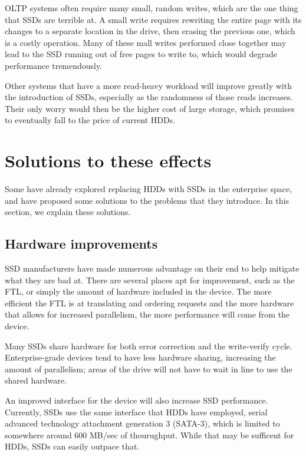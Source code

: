\documentclass[format=acmsmall, review=false, screen=true]{acmart}
\begin{document}
OLTP systems often require many small, random writes, which are the one thing that SSDs are terrible at. A small write 
requires rewriting the entire page with its changes to a separate location in the drive, then erasing the previous one, 
which is a costly operation. Many of these mall writes performed close together may lead to the SSD running out of free 
pages to write to, which would degrade performance tremendously. \cite{Cornwell2012, Micheloni2013, MatejFucek2014, Chen2016}

Other systems that have a more read-heavy workload will improve greatly with the introduction of SSDs, especially as the 
randomness of those reads increases. Their only worry would then be the higher cost of large storage, which promises to 
eventually fall to the price of current HDDs. \cite{Chen2016}

\section{Solutions to these effects}

Some have already explored replacing HDDs with SSDs in the enterprise space, and have proposed some solutions to the 
problems that they introduce. In this section, we explain these solutions.

\subsection{Hardware improvements}

SSD manufacturers have made numerous advantage on their end to help mitigate what they are bad at. There are several 
places apt for improvement, such as the FTL, or simply the amount of hardware included in the device. The more efficient 
the FTL is at translating and ordering requests and the more hardware that allows for increased parallelism, the more 
performance will come from the device. \cite{Xie2011, Chen2016}

Many SSDs share hardware for both error correction and the write-verify cycle. Enterprise-grade devices tend to have 
less hardware sharing, increasing the amount of parallelism; areas of the drive will not have to wait in line to use 
the shared hardware. \cite{Dirik2009, Cornwell2012, Micheloni2013, MatejFucek2014, Chen2016}

An improved interface for the device will also increase SSD performance. Currently, SSDs use the same interface that 
HDDs have employed, serial advanced technology attachment generation 3 (SATA-3), which is limited to somewhere around
600 MB/sec of thourughput. While that may be sufficent for HDDs, SSDs can easily outpace that. \cite{Micheloni2013}
\end{document}
